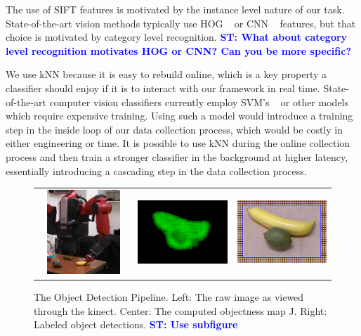 \documentclass[conference]{IEEEtran}
\newcommand{\stnote}[1]{\textcolor{blue}{\textbf{ST: #1}}}
\begin{document}
The use of SIFT features is motivated by the instance level nature of
our task. State-of-the-art vision methods typically use HOG ~\citep{}
or CNN ~\citep{} features, but that choice is motivated by category
level recognition. \stnote{What about category level recognition
  motivates HOG or CNN?  Can you be more specific?}

We use kNN because it is easy to rebuild online, which is a key
property a classifier should enjoy if it is to interact with our
framework in real time. State-of-the-art computer vision classifiers
currently employ SVM's ~\citep{} or other models which require
expensive training. Using such a model would introduce a training step
in the inside loop of our data collection process, which would be
costly in either engineering or time.  It is possible to use kNN
during the online collection process and then train a stronger
classifier in the background at higher latency, essentially
introducing a cascading step in the data collection process.

\begin{figure}
  \begin{center}
    \begin{tabular}{l c r}
      \includegraphics[width=160px, height=120px]{kinect.png} &
      \includegraphics[width=160px, height=120px]{objectness.png} &
      \includegraphics[width=160px, height=120px]{blueBoxes.png} \\
    \end{tabular}
  \end{center}
  \caption{The Object Detection Pipeline. Left: The raw image as viewed through the kinect. 
    Center: The computed objectness map J. Right: Labeled object detections. \stnote{Use subfigure}}
\end{figure}
\end{document}
